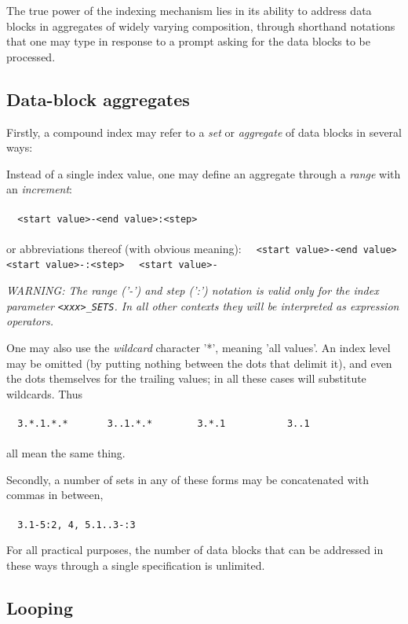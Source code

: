 	The true power of the indexing mechanism lies in its ability to address data blocks in aggregates of widely varying composition, through shorthand notations that one may type in response to a prompt asking for the data blocks to be processed.


\subsection{ Data-block aggregates }
\label{.sets}

	Firstly, a compound index may refer to a {\em set} or {\em aggregate} of data blocks in several ways:

\bi
\item   Instead of a single index value, one may define an aggregate through a {\em range} with an {\em increment}:
\\ \\
\verb/  <start value>-<end value>:<step>/
\\ \\
or abbreviations thereof (with obvious meaning):
\spbegin
\verb/  <start value>-<end value>/
\verb/  <start value>-:<step>/
\verb/  <start value>-/
\spend
  \bi
  \item[] {\em WARNING: The range ('-') and step (':') notation is valid {\em only} for the index parameter \verb/<xxx>_SETS/. In all other contexts they will be interpreted as expression operators.}
  \ei
\item   One may also use the {\em wildcard} character '*', meaning 'all values'. An index level may be omitted (by putting nothing between the dots that delimit it), and even the dots themselves for the trailing values; in all these cases \NEWSTAR will substitute wildcards. Thus
\\ \\
\verb/  3.*.1.*.*       3..1.*.*        3.*.1           3..1/
\\ \\
all mean the same thing.

\item   Secondly, a number of sets in any of these forms may be concatenated with commas in between, \eg
\\ \\
\verb/  3.1-5:2, 4, 5.1..3-:3/
\ei

	For all practical purposes, the number of data blocks that can be addressed in these ways through a single specification is unlimited.


\subsection{ Looping}
\label{.looping}

